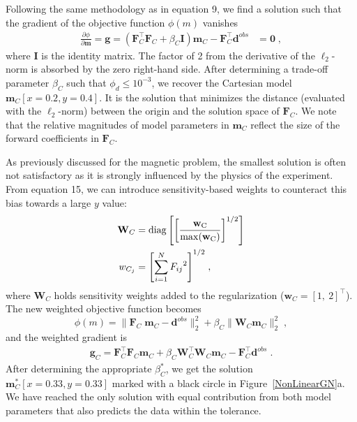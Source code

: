 \documentclass[paper]{geophysics}
\begin{document}
Following the same methodology as in equation 9, we find a solution such that the gradient of the objective function $\phi(m)$ vanishes
\begin{equation}\label{gradLinear}
\begin{split}
\frac{\partial \phi}{\partial \mathbf{m}}=\mathbf{g} = \left(\mathbf{F}_C^\top\mathbf{F}_C + \beta_C \mathbf{I}\right) \mathbf{m}_C - \mathbf{F}_C^\top \mathbf{d}^{obs} &= \mathbf{0}\;,
\end{split}
\end{equation}
where $\mathbf{I}$ is the identity matrix. The factor of 2 from the derivative of the $\ell_2$-norm is absorbed by the zero right-hand side.
After determining a trade-off parameter $\beta_C$ such that $\phi_d \leq 10^{-3}$, we recover the Cartesian model $\mathbf{m}_C[x=0.2, y=0.4]$. It is the solution that minimizes the distance (evaluated with the $\ell_2$-norm) between the origin and the solution space of $\mathbf{F}_C$. We note that the relative magnitudes of model parameters in $\mathbf{m}_C$ reflect the size of the forward coefficients in $\mathbf{F}_C$.


As previously discussed for the magnetic problem, the smallest solution is often not satisfactory as it is strongly influenced by the physics of the experiment.
From equation 15, we can introduce sensitivity-based weights to counteract this bias towards a large $y$ value:
\begin{equation}
\begin{split}
\mathbf{W}_C &= \rm{diag} \left[ {\left[\frac{\mathbf{ w}_C}{\rm{max}(\mathbf{ w}_C)}\right]}^{1/2}\right]\\
w_{C_j} &= {\left[\sum_{i=1}^{N}{F_{ij}}^2 \right]}^{1/2}\;,
\end{split}
\end{equation}
where $\mathbf{W}_C$ holds sensitivity weights added to the regularization ($\mathbf{w}_C=[1,\:2]^\top$).
The new weighted objective function becomes
\begin{equation}\label{toyProblem}
\phi(m) = \| \mathbf{F}_C\;\mathbf{m}_C - \mathbf{d}^{obs} \|_2^2 + \beta_C \| \mathbf{W}_C \mathbf{m}_C \|_2^2 \;,
\end{equation}
and the weighted gradient is
\begin{equation}\label{gradLinearWeighted}
\begin{split}
\mathbf{g}_C = \mathbf{F}_C^\top\mathbf{F}_C \mathbf{m}_C + \beta_C \mathbf{W}_C^\top\mathbf{W}_C\mathbf{m}_C - \mathbf{F}_C^\top \mathbf{d}^{obs}\;.
\end{split}
\end{equation}
After determining the appropriate $\beta_C^*$, we get the solution $\mathbf{m}^*_C[x=0.33, y=0.33]$ marked with a black circle in Figure~\ref{NonLinearGN}a. We have reached the only solution with equal contribution from both model parameters that also predicts the data within the tolerance.
\end{document}

